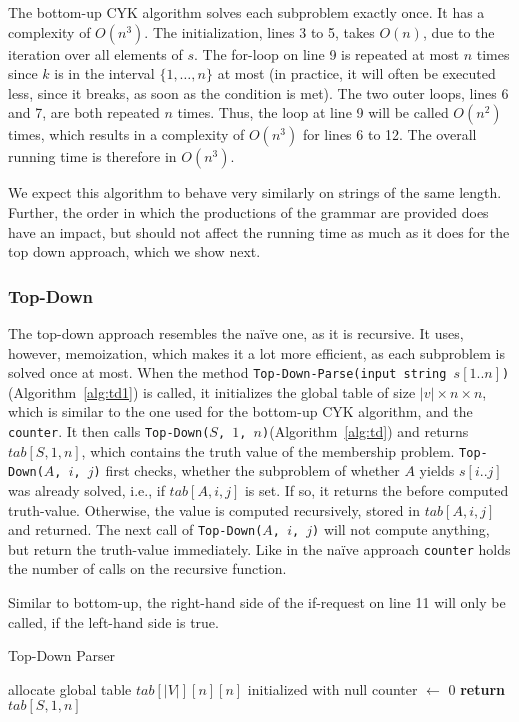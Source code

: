 The bottom-up CYK algorithm solves each subproblem exactly once.
It has a complexity of $O(n^3)$.
The initialization, lines 3 to 5, takes $O(n)$, due to the iteration over all elements of $s$.
The for-loop on line 9 is repeated at most $n$ times since $k$ is in the interval $\{1,\dots,n\}$ at most (in practice, it will often be executed less, since it breaks, as soon as the condition is met).
The two outer loops, lines 6 and 7, are both repeated $n$ times.
Thus, the loop at line 9 will be called $O(n^2)$ times, which results in a complexity of $O(n^3)$ for lines 6 to 12.
The overall running time is therefore in $O(n^3)$.

We expect this algorithm to behave very similarly on strings of the same length.
Further, the order in which the productions of the grammar are provided does have an impact, but should not affect the running time as much as it does for the top down approach, which we show next.

\subsubsection{Top-Down}
\label{sec:top_down}
The top-down approach resembles the na\"{i}ve one, as it is recursive.
It uses, however, memoization, which makes it a lot more efficient, as each subproblem is solved once at most.
When the method \texttt{Top-Down-Parse(input string $s[1..n]$)}(Algorithm~\ref{alg:td1}) is called, it initializes the global table of size $|v|\times n\times n$, which is similar to the one used for the bottom-up CYK algorithm, and the \texttt{counter}.
It then calls \texttt{Top-Down($S$, $1$, $n$)}(Algorithm~\ref{alg:td}) and returns $tab[S,1,n]$, which contains the truth value of the membership problem.
\texttt{Top-Down($A$, $i$, $j$)} first checks, whether the subproblem of whether $A$ yields $s[i..j]$ was already solved, i.e., if $tab[A,i,j]$ is set.
If so, it returns the before computed truth-value.
Otherwise, the value is computed recursively, stored in $tab[A,i,j]$ and returned.
The next call of \texttt{Top-Down($A$, $i$, $j$)} will not compute anything, but return the truth-value immediately.
Like in the na\"{i}ve approach \texttt{counter} holds the number of calls on the recursive function.

Similar to bottom-up, the right-hand side of the if-request on line 11 will only be called, if the left-hand side is true.

\begin{algorithm}[H]
    \caption{Top-Down Parser}
    \label{alg:td1}
    \begin{algorithmic}[1]
        \State allocate global table $tab[|V|][n][n]$ initialized with null
        \State counter $\leftarrow$ 0
        \State {}
        \State \textbf{return} $tab[S,1,n]$
        \EndFunction
    \end{algorithmic}
\end{algorithm}

